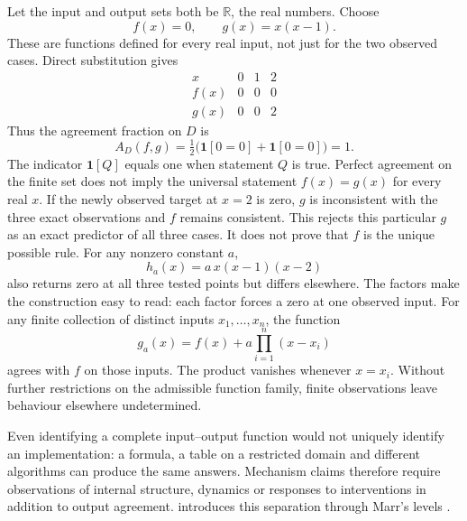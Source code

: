 Let the input and output sets both be $\mathbb R$, the real numbers. Choose
\[
f(x)=0,\qquad g(x)=x(x-1).
\]
These are functions defined for every real input, not just for the two observed cases. Direct substitution gives
\[
\begin{array}{c|ccc}
x&0&1&2\\\hline
f(x)&0&0&0\\
g(x)&0&0&2
\end{array}
\]
Thus the agreement fraction on $D$ is
\[
A_D(f,g)=\tfrac12\bigl(\mathbf1[0=0]+\mathbf1[0=0]\bigr)=1.
\]
The indicator $\mathbf1[Q]$ equals one when statement $Q$ is true. Perfect agreement on the finite set does not imply the universal statement $f(x)=g(x)$ for every real $x$.
If the newly observed target at $x=2$ is zero, $g$ is inconsistent with the three exact observations and $f$ remains consistent. This rejects this particular $g$ as an exact predictor of all three cases. It does not prove that $f$ is the unique possible rule. For any nonzero constant $a$,
\[
h_a(x)=a\,x(x-1)(x-2)
\]
also returns zero at all three tested points but differs elsewhere. The factors make the construction easy to read: each factor forces a zero at one observed input.
For any finite collection of distinct inputs $x_1,\ldots,x_n$, the function
\[
g_a(x)=f(x)+a\prod_{i=1}^n(x-x_i)
\]
agrees with $f$ on those inputs. The product vanishes whenever $x=x_i$. Without further restrictions on the admissible function family, finite observations leave behaviour elsewhere undetermined.

Even identifying a complete input--output function would not uniquely identify an implementation: a formula, a table on a restricted domain and different algorithms can produce the same answers. Mechanism claims therefore require observations of internal structure, dynamics or responses to interventions in addition to output agreement.  introduces this separation through Marr's levels \citep{marr2010}.

